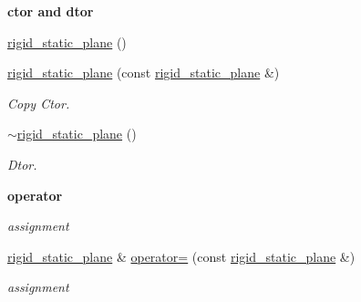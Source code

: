 \begin{Indent}{\bf ctor and dtor}\par
{\em \label{_amgrp98fbd3e5ae66fcd014fb744fec76c58d}
 }\begin{DoxyCompactItemize}
\item 
\hyperlink{classnebula_1_1content_1_1actor_1_1physics_1_1physx_1_1rigid__static__plane_abb60e005401fff6b0e8dda22e719ec5e}{rigid\_\-static\_\-plane} ()
\item 
\hyperlink{classnebula_1_1content_1_1actor_1_1physics_1_1physx_1_1rigid__static__plane_ab5177db753f31243971615cacfa67060}{rigid\_\-static\_\-plane} (const \hyperlink{classnebula_1_1content_1_1actor_1_1physics_1_1physx_1_1rigid__static__plane}{rigid\_\-static\_\-plane} \&)
\begin{DoxyCompactList}\small\item\em Copy Ctor. \item\end{DoxyCompactList}\item 
\hyperlink{classnebula_1_1content_1_1actor_1_1physics_1_1physx_1_1rigid__static__plane_a0a2b698c6355ef43fce8ede0c1859519}{$\sim$rigid\_\-static\_\-plane} ()
\begin{DoxyCompactList}\small\item\em Dtor. \item\end{DoxyCompactList}\end{DoxyCompactItemize}
\end{Indent}
\begin{Indent}{\bf operator}\par
{\em \label{_amgrp4b583376b2767b923c3e1da60d10de59}
 assignment }\begin{DoxyCompactItemize}
\item 
\hyperlink{classnebula_1_1content_1_1actor_1_1physics_1_1physx_1_1rigid__static__plane}{rigid\_\-static\_\-plane} \& \hyperlink{classnebula_1_1content_1_1actor_1_1physics_1_1physx_1_1rigid__static__plane_a16d2723283f762b1046631cec801f211}{operator=} (const \hyperlink{classnebula_1_1content_1_1actor_1_1physics_1_1physx_1_1rigid__static__plane}{rigid\_\-static\_\-plane} \&)
\begin{DoxyCompactList}\small\item\em assignment \item\end{DoxyCompactList}\end{DoxyCompactItemize}
\end{Indent}


